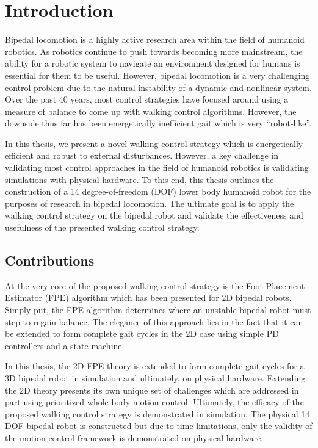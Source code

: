 \chapter{Introduction} %
\label{cha:introduction}
Bipedal locomotion is a highly active research area within the field of humanoid robotics. As robotics continue to push towards becoming more mainstream, the ability for a robotic system to navigate an environment designed for humans is essential for them to be useful. However, bipedal locomotion is a very challenging control problem due to the natural instability of a dynamic and nonlinear system. Over the past 40 years, most control strategies have focused around using a measure of balance to come up with walking control algorithms. However, the downside thus far has been energetically inefficient gait which is very ``robot-like''. 

In this thesis, we present a novel walking control strategy which is energetically efficient and robust to external disturbances. However, a key challenge in validating most control approaches in the field of humanoid robotics is validating simulations with physical hardware. To this end, this thesis outlines the construction of a 14 degree-of-freedom (DOF) lower body humanoid robot for the purposes of research in bipedal locomotion. The ultimate goal is to apply the walking control strategy on the bipedal robot and validate the effectiveness and usefulness of the presented walking control strategy. 

\section{Contributions} %
\label{sec:contributions}
At the very core of the proposed walking control strategy is the Foot Placement Estimator (FPE) algorithm which has been presented for 2D bipedal robots. Simply put, the FPE algorithm determines where an unstable bipedal robot must step to regain balance. The elegance of this approach lies in the fact that it can be extended to form complete gait cycles in the 2D case using simple PD controllers and a state machine. 

In this thesis, the 2D FPE theory is extended to form complete gait cycles for a 3D bipedal robot in simulation and ultimately, on physical hardware. Extending the 2D theory presents its own unique set of challenges which are addressed in part using prioritized whole body motion control. Ultimately, the efficacy of the proposed walking control strategy is demonstrated in simulation. The physical 14 DOF bipedal robot is constructed but due to time limitations, only the validity of the motion control framework is demonstrated on physical hardware. 

